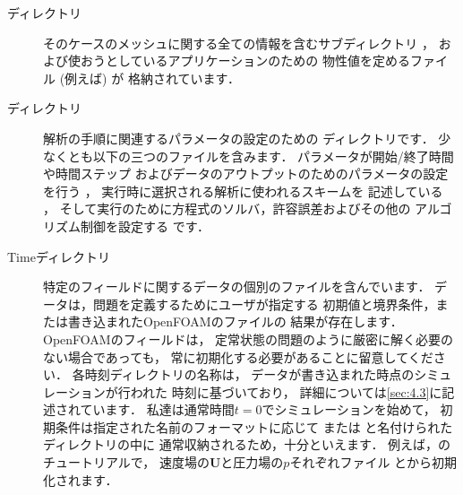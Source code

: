 \begin{description}
 \item[ディレクトリ]
%
%
            そのケースのメッシュに関する全ての情報を含むサブディレクトリ
%
%
            ，
            および使おうとしているアプリケーションのための
            物性値を定めるファイル (例えば) が
            格納されています．
 \item[ディレクトリ]
%
%
            解析の手順に関連するパラメータの設定のための
            ディレクトリです．
            少なくとも以下の三つのファイルを含みます．
            パラメータが開始/終了時間や時間ステップ
            およびデータのアウトプットのためのパラメータの設定を行う
%
%
            ，
            実行時に選択される解析に使われるスキームを
            記述している
%
%
            ，
            そして実行のために方程式のソルバ，許容誤差およびその他の
            アルゴリズム制御を設定する
%
%
            です．
 \item[Timeディレクトリ]
            特定のフィールドに関するデータの個別のファイルを含んでいます．
            データは，問題を定義するためにユーザが指定する
            初期値と境界条件，または書き込まれたOpenFOAMのファイルの
            結果が存在します．OpenFOAMのフィールドは，
            定常状態の問題のように厳密に解く必要のない場合であっても，
            常に初期化する必要があることに留意してください．
            各時刻ディレクトリの名称は，
            データが書き込まれた時点のシミュレーションが行われた
            時刻に基づいており，
            詳細については\autoref{sec:4.3}に記述されています．
            私達は通常時間$t = 0$でシミュレーションを始めて，
            初期条件は指定された名前のフォーマットに応じて
%
%
            または
%
%
            と名付けられたディレクトリの中に
            通常収納されるため，十分といえます．
            例えば，のチュートリアルで，
            速度場の$\bm{U}$と圧力場の$p$それぞれファイル
            とから初期化されます．
\end{description}



